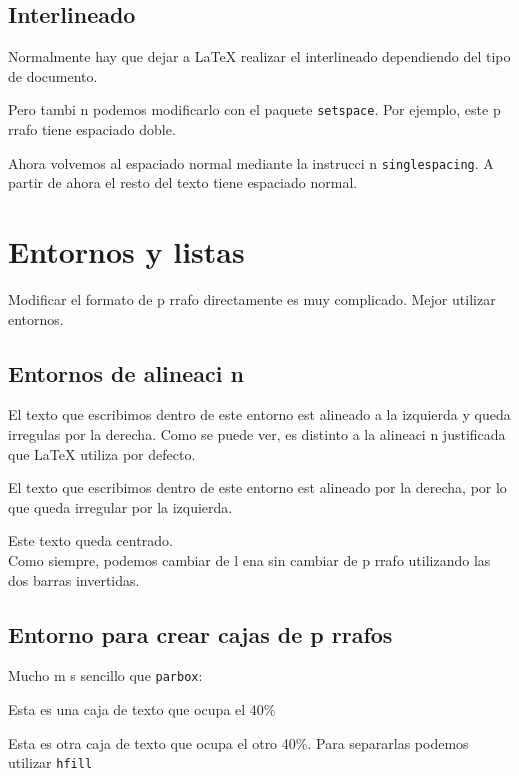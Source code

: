 \documentclass{article}
\begin{document}
\subsection{Interlineado}
\label{sec:interlineado}

Normalmente hay que dejar a \LaTeX{} realizar el interlineado dependiendo del tipo de documento.

\doublespacing
Pero tambi n podemos modificarlo con el paquete \texttt{setspace}. Por ejemplo, este p rrafo tiene espaciado doble.

\singlespacing
Ahora volvemos al espaciado normal mediante la instrucci n \texttt{singlespacing}. A partir de ahora el resto del texto tiene espaciado normal.

\section{Entornos y listas}
\label{sec:entornosylistas}

Modificar el formato de p rrafo directamente es muy complicado. Mejor utilizar entornos.

\subsection{Entornos de alineaci n}
\label{sec:entornoalineacion}

El texto que escribimos dentro de este entorno est  alineado a la izquierda y queda irregulas por la derecha. Como se puede ver, es distinto a la alineaci n justificada que \LaTeX{} utiliza por defecto.

\begin{flushright}
  El texto que escribimos dentro de este entorno est  alineado por la derecha, por lo que queda irregular por la izquierda.
\end{flushright}

\begin{center}
  Este texto queda centrado.\\
Como siempre, podemos cambiar de l ena sin cambiar de p rrafo utilizando las dos barras invertidas.
\end{center}

\subsection{Entorno para crear cajas de p rrafos}
\label{sec:entornocajasparrafos}
Mucho m s sencillo que \texttt{parbox}:

\begin{minipage}[l]{0.4\linewidth}
Esta es una caja de texto que ocupa el 40\%
\end{minipage}
\hfill{}
\begin{minipage}[r]{0.4\linewidth}
  Esta es otra caja de texto que ocupa el otro 40\%. Para separarlas podemos utilizar \texttt{hfill}
\end{minipage}
\end{document}
